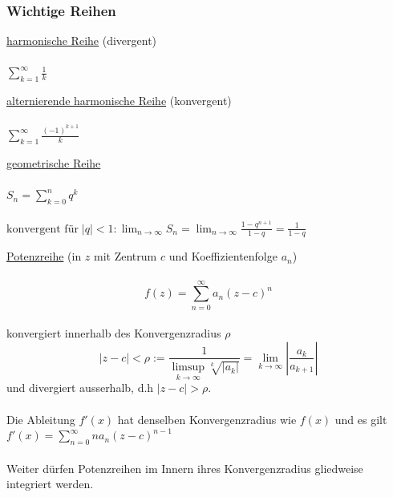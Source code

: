 \documentclass[6pt]{article}
\begin{document}
\begin{multicols*}{3}
\subsubsection*{Wichtige Reihen}
	\underline{harmonische Reihe}  (divergent) \\
		\vspace{0mm}\\
		$\sum_{k=1}^\infty \frac{1}{k}$   \\
		\vspace{0mm}
		
	\underline{alternierende harmonische Reihe} (konvergent) \\
		\vspace{0mm}\\
		$\sum_{k = 1}^\infty \frac{(-1)^{k + 1}}{k}$\\
		\vspace{0mm}

	\underline{geometrische Reihe} \\
		\vspace{0mm}\\
		$ S_n = \sum_{k=0}^n q^k \quad $\\
		\vspace{-1mm}\\
		$\text{konvergent f{\"u}r} \; |q| < 1 : \lim_{n \to \infty} S_n = \lim_{n \to \infty} \frac{1-q^{n+1}}{1-q} = \frac{1}{1-q}$ \\
		\vspace{0mm}
		
	\underline{Potenzreihe} (in $z$ mit Zentrum $c$ und Koeffizientenfolge $a_n$)\\
		\vspace{-5mm}\\
			\begin{equation*}
				f(z) = \sum_{n=0}^\infty a_n \left( z-c \right)^n
			\end{equation*}
			\vspace{-3mm}\\
			konvergiert innerhalb des Konvergenzradius $\rho$ \\
			\vspace{-3mm}
			\begin{equation*}
				|z-c| < \rho := \frac{1}{\limsup\limits_{k \to \infty} \sqrt[k]{ \left| a_k \right|}} = \lim_{k \to \infty} \left| \frac{a_{k}}{a_{k+1}} \right|
			\end{equation*}
			und divergiert ausserhalb, d.h $|z - c| > \rho$. \\ 
			\vspace{-2mm}\\
			Die Ableitung $f'(x)$ hat denselben Konvergenzradius wie $f(x)$ und es gilt
			$ f'(x) =  \sum_{n=0}^\infty n a_n \left( z-c \right)^{n-1} $ \\
			\vspace{-2mm}\\
			Weiter d{\"u}rfen Potenzreihen im Innern ihres Konvergenzradius gliedweise integriert werden.
			\vspace{5mm}


\end{multicols*}
\end{document}
